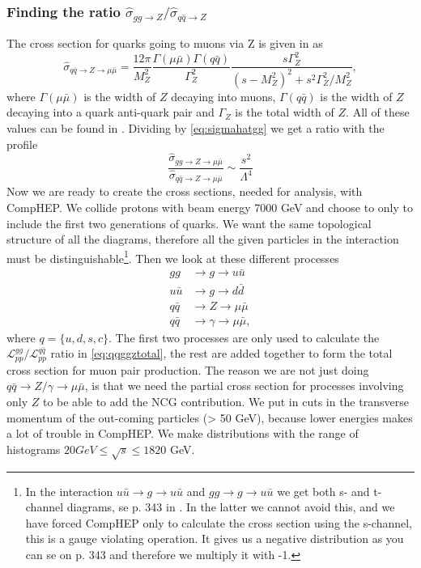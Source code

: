 \subsubsection{Finding the ratio ${\hat \sigma_{gg \rightarrow Z}}/{\hat \sigma_{q \bar q \rightarrow Z}}$}
The cross section for quarks going to muons via Z is given in \cite{amsler2008rpp} as
\begin{equation}
	\hat \sigma_{q \bar q \rightarrow Z \rightarrow \mu \bar \mu} = \frac{12 \pi}{M_{Z}^{2}}\frac{\Gamma(\mu \bar \mu)\Gamma(q\bar q)}{\Gamma^{2}_{Z}}\frac{s\Gamma^{2}_{Z}}{(s-M_{Z}^{2})^{2}+s^{2}\Gamma_{Z}^{2}/M_{Z}^{2}},
\end{equation}
where $\Gamma(\mu \bar \mu)$ is the width of $Z$ decaying into muons, $\Gamma(q \bar q)$ is the width of $Z$ decaying into a quark anti-quark pair and $\Gamma_Z$ is the total width of $Z$. All of these values can be found in \cite{amsler2008rpp}. Dividing by \ref{eq:sigmahatgg} we get a ratio with the profile
\begin{equation}
	\frac{\hat \sigma_{gg \rightarrow Z \rightarrow \mu \bar \mu}}{\hat \sigma_{q \bar q \rightarrow Z \rightarrow \mu \bar \mu}} \sim \frac{s^{2}}{\Lambda^{4}}
\end{equation}
Now we are ready to create the cross sections, needed for analysis, with CompHEP. We collide protons with beam energy 7000 GeV and choose to only to include the first two generations of quarks. We want the same topological structure of all the diagrams, therefore all the given particles in the interaction must be distinguishable\footnote{In the interaction $u \bar u \rightarrow g \rightarrow u \bar u$ and $gg \rightarrow g \rightarrow u \bar u$ we get both s- and t-channel diagrams, se p. 343 in \cite{burgess2007smp}. In the latter we cannot avoid this, and we have forced CompHEP only to calculate the cross section using the s-channel, this is a gauge violating operation. It gives us a negative distribution as you can se on p. 343 and therefore we multiply it with -1.}. Then we look at these different processes
\begin{align}
gg &\rightarrow g \rightarrow u \bar u \nonumber \\ \nonumber
u \bar u &\rightarrow g \rightarrow d \bar d \\ \nonumber
q \bar q &\rightarrow Z \rightarrow \mu \bar \mu \\ \nonumber
q \bar q &\rightarrow \gamma \rightarrow \mu \bar \mu,
\end{align}
where $q = \{u,d,s,c\}$. The first two processes are only used to calculate the ${\mathcal{L}_{pp}^{gg}}/{\mathcal{L}_{pp}^{q \bar q}}$ ratio in \eqref{eq:qqggztotal}, the rest are added together to form the total cross section for muon pair production. The reason we are not just doing $q \bar q \rightarrow Z/ \gamma \rightarrow \mu \bar \mu$, is that we need the partial cross section for processes involving only $Z$ to be able to add the NCG contribution. We put in cuts in the transverse momentum of the out-coming particles (> 50 GeV), because lower energies makes a lot of trouble in CompHEP. We make distributions with the range of histograms $20 GeV \leq \sqrt{s} \leq 1820$ GeV.

